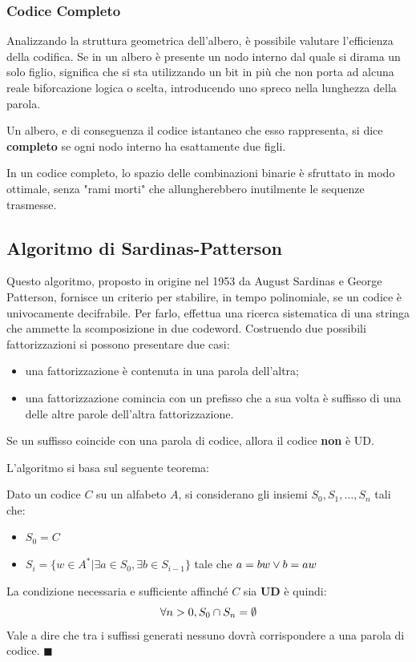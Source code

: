 \subsubsection{Codice Completo}
Analizzando la struttura geometrica dell'albero, è possibile valutare l'efficienza della codifica. Se in un albero è presente un nodo interno dal quale si dirama un solo figlio, significa che si sta utilizzando un bit in più che non porta ad alcuna reale biforcazione logica o scelta, introducendo uno spreco nella lunghezza della parola.
\begin{definition}
    Un albero, e di conseguenza il codice istantaneo che esso rappresenta, si dice \textbf{completo} se ogni nodo interno ha esattamente due figli.
\end{definition}
In un codice completo, lo spazio delle combinazioni binarie è sfruttato in modo ottimale, senza "rami morti" che allungherebbero inutilmente le sequenze trasmesse.


\subsection{Algoritmo di Sardinas-Patterson}
Questo algoritmo, proposto in origine nel 1953 da August Sardinas e George Patterson, fornisce un criterio per stabilire, in tempo polinomiale, se un codice è univocamente decifrabile. Per farlo, effettua una ricerca sistematica di una stringa che ammette la scomposizione in due codeword.
Costruendo due possibili fattorizzazioni si possono presentare due casi:
\begin{itemize}
    \item una fattorizzazione è contenuta in una parola dell'altra;
    \item una fattorizzazione comincia con un prefisso che a sua volta è suffisso di una delle altre parole dell'altra fattorizzazione.
\end{itemize}
Se un suffisso coincide con una parola di codice, allora il codice \textbf{non} è UD.

L'algoritmo si basa sul seguente teorema:
\begin{theorem}
Dato un codice $C$ su un alfabeto $A$, si considerano gli insiemi $S_0,S_1,\dots,S_n$ tali che:
\begin{itemize}
    \item $S_0 = C$
    \item $S_i = \{w \in A^* | \exists a \in S_0, \exists b \in S_{i-1}\}$ tale che $a = bw \space \vee b = aw$
\end{itemize}
La condizione necessaria e sufficiente affinché $C$ sia \textbf{UD} è quindi:
\[\forall n >0 \space , S_0\cap S_n = \emptyset \]
Vale a dire che tra i suffissi generati nessuno dovrà corrispondere a una parola di codice.
$\blacksquare$
\end{theorem}

